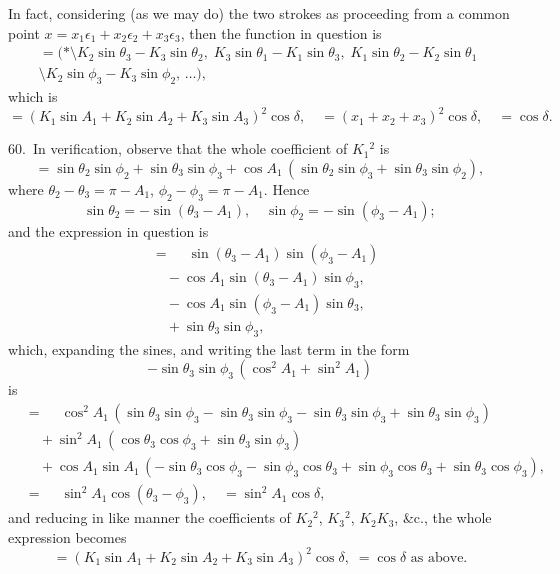 \documentclass[11pt,a4paper]{book}
\begin{document}
In fact, considering (as we may do) the two strokes as proceeding from a common
point $x = x_1 \epsilon_1 + x_2 \epsilon_2 + x_3 \epsilon_3$, then the function in question is
\begin{multline*}
= (*\!\mathbin{\!\!\setminus\!\!}K_2 \sin \theta_3 - K_3 \sin \theta_2,\;
K_3 \sin \theta_1 - K_1 \sin \theta_3,\;
K_1 \sin \theta_2 - K_2 \sin \theta_1\;\\
\mathbin{\!\!\setminus\!\!}
K_2 \sin \phi_3 - K_3 \sin \phi_2,\, \ldots),
\end{multline*}
which is
\[
= (K_1 \sin A_1 + K_2 \sin A_2 + K_3 \sin A_3)^2 \cos \delta,
\quad = (x_1 + x_2 + x_3)^2 \cos \delta, \quad = \cos \delta.
\]

60.\ In verification, observe that the whole coefficient of $K_1{}^2$ is
\[
= \sin \theta_2 \sin \phi_2 + \sin \theta_3 \sin \phi_3
+ \cos A_1 \, (\sin \theta_2 \sin \phi_3 + \sin \theta_3 \sin \phi_2),
\]
where $\theta_2 - \theta_3 = \pi - A_1$, $\phi_2 - \phi_3 = \pi - A_1$. Hence
\[
\sin \theta_2 = -\sin(\theta_3 - A_1), \quad \sin \phi_2 = -\sin(\phi_3 - A_1);
\]
and the expression in question is
\begin{align*}
&= \phantom{+} \sin(\theta_3 - A_1) \sin(\phi_3 - A_1)\\
&\quad - \cos A_1 \sin(\theta_3 - A_1) \sin \phi_3,\\
&\quad - \cos A_1 \sin(\phi_3 - A_1) \sin \theta_3,\\
&\quad + \sin \theta_3 \sin \phi_3,
\end{align*}
which, expanding the sines, and writing the last term in the form
\[
-\sin \theta_3 \sin \phi_3 \, (\cos^2 A_1 + \sin^2 A_1)
\]
is
\begin{align*}
&= \phantom{+} \cos^2 A_1 \, (\sin \theta_3 \sin \phi_3 - \sin \theta_3 \sin \phi_3
- \sin \theta_3 \sin \phi_3 + \sin \theta_3 \sin \phi_3)\\
&\quad + \sin^2 A_1 \, (\cos \theta_3 \cos \phi_3 + \sin \theta_3 \sin \phi_3)\\
&\quad + \cos A_1 \sin A_1 \,
(-\sin \theta_3 \cos \phi_3 - \sin \phi_3 \cos \theta_3
+ \sin \phi_3 \cos \theta_3 + \sin \theta_3 \cos \phi_3),\\
&= \phantom{+} \sin^2 A_1 \cos(\theta_3 - \phi_3), \quad = \sin^2 A_1 \cos \delta,
\end{align*}
and reducing in like manner the coefficients of $K_2{}^2$, $K_3{}^2$, $K_2 K_3$, \&c.,
the whole expression becomes
\[
= (K_1 \sin A_1 + K_2 \sin A_2 + K_3 \sin A_3)^2 \cos \delta,
\; = \cos \delta \text{ as above}.
\]
\end{document}
